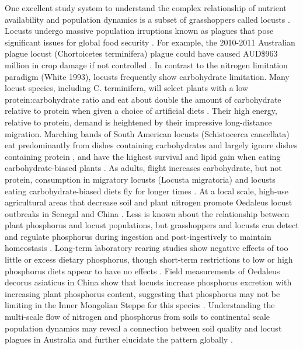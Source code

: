 \documentclass[
]{article}
\begin{document}
One excellent study system to understand the complex relationship of
nutrient availability and population dynamics is a subset of
grasshoppers called locusts
\citep{cullen_molecules_2017, uvarov_grasshoppers_1977}. Locusts undergo
massive population irruptions known as plagues that pose significant
issues for global food security \citep{cease_living_2015}. For example,
the 2010-2011 Australian plague locust (Chortoicetes terminifera) plague
could have caused AUD\$963 million in crop damage if not controlled
\citep{millist_nicola_benefitcost_nodate}. In contrast to the nitrogen
limitation paradigm (White 1993), locusts frequently show carbohydrate
limitation. Many locust species, including C. terminifera, will select
plants with a low protein:carbohydrate ratio and eat about double the
amount of carbohydrate relative to protein when given a choice of
artificial diets
\citep{behmer_insect_2009, brosemann_nutrient_2023, lawton_mismatched_2021, le_gall_global_2019}.
Their high energy, relative to protein, demand is heightened by their
impressive long-distance migration. Marching bands of South American
locusts (Schistocerca cancellata) eat predominantly from dishes
containing carbohydrates and largely ignore dishes containing protein
\citep{cease_field_2023}, and have the highest survival and lipid gain
when eating carbohydrate-biased plants \citep{talal_plant_2020}. As
adults, flight increases carbohydrate, but not protein, consumption in
migratory locusts (Locusta migratoria) and locusts eating
carbohydrate-biased diets fly for longer times \citep{talal_body_2023}.
At a local scale, high-use agricultural areas that decrease soil and
plant nitrogen promote Oedaleus locust outbreaks in Senegal and China
\citep{cease_heavy_2012, giese_n_2013, le_gall_global_2019, word_soil-targeted_2019}.
Less is known about the relationship between plant phosphorus and locust
populations, but grasshoppers and locusts can detect and regulate
phosphorus during ingestion and post-ingestively to maintain homeostasis
\citep{cease_dietary_2016, zhang_grasshoppers_2014}. Long-term
laboratory rearing studies show negative effects of too little or excess
dietary phosphorus, though short-term restrictions to low or high
phosphorus diets appear to have no effects \citep{cease_dietary_2016}.
Field measurements of Oedaleus decorus asiaticus in China show that
locusts increase phosphorus excretion with increasing plant phosphorus
content, suggesting that phosphorus may not be limiting in the Inner
Mongolian Steppe for this species \citep{zhang_grasshoppers_2014}.
Understanding the multi-scale flow of nitrogen and phosphorus from soils
to continental scale population dynamics may reveal a connection between
soil quality and locust plagues in Australia and further elucidate the
pattern globally \citep{cease_how_2024, le_gall_global_2019}.
\end{document}
